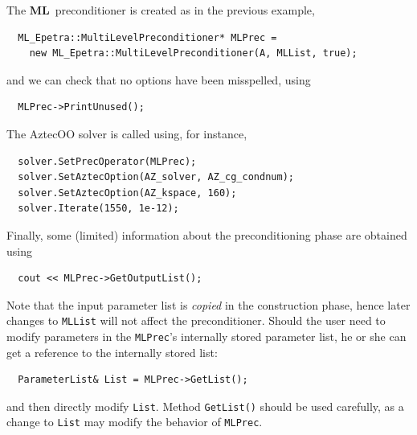 \documentclass{article}[11pt]
\newcommand{\ML}     {{\bf ML}}
\begin{document}
The \ML\ preconditioner is created as in the previous example,
\begin{verbatim}
  ML_Epetra::MultiLevelPreconditioner* MLPrec =
    new ML_Epetra::MultiLevelPreconditioner(A, MLList, true);
\end{verbatim}
and we can check that no options have been misspelled, using
\begin{verbatim}
  MLPrec->PrintUnused();
\end{verbatim}
The AztecOO solver is called using, for instance,
\begin{verbatim}
  solver.SetPrecOperator(MLPrec);
  solver.SetAztecOption(AZ_solver, AZ_cg_condnum);
  solver.SetAztecOption(AZ_kspace, 160);
  solver.Iterate(1550, 1e-12);
\end{verbatim}
Finally, some (limited) information about the preconditioning phase are
obtained using
\begin{verbatim}
  cout << MLPrec->GetOutputList();
\end{verbatim}

Note that the input parameter list is {\sl copied} in the
construction phase, hence later changes to \verb!MLList! will not affect
the preconditioner. Should the user need to modify parameters in the
\verb!MLPrec!'s internally stored parameter list, he or she can get a
reference to the internally stored list:
%
\begin{verbatim}
  ParameterList& List = MLPrec->GetList();
\end{verbatim}
%
and then directly modify \verb!List!. Method \verb!GetList()! should be used
carefully, as a change to \verb!List! may modify the behavior of
\verb!MLPrec!.
\end{document}
